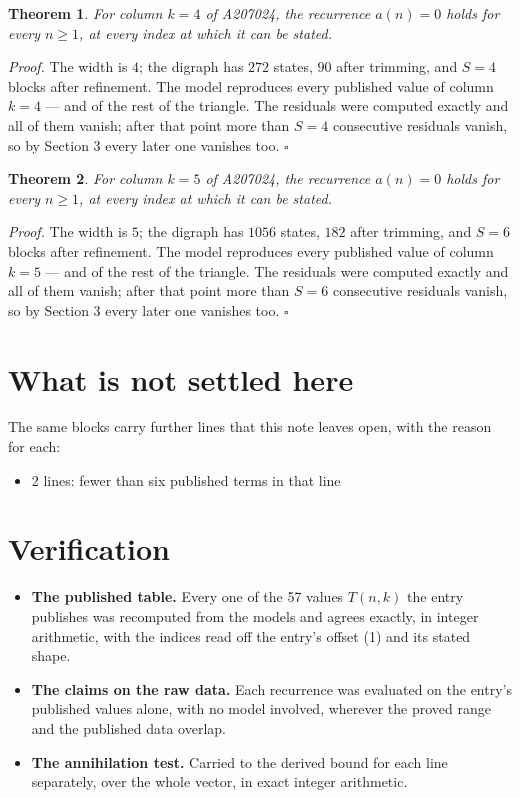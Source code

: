 \documentclass[11pt]{article}
\newtheorem{theorem}{Theorem}
\theoremstyle{definition}
\begin{document}
\begin{theorem} For column $k = 4$ of A207024, the recurrence $a(n) = 0$ holds for every $n \ge 1$, at every index at which it can be stated.\end{theorem}

{\itshape Proof.} The width is $4$; the digraph has $272$ states, $90$ after trimming, and $S = 4$ blocks after refinement. The model reproduces every published value of column $k = 4$ --- and of the rest of the triangle. The residuals were computed exactly and all of them vanish; after that point more than $S = 4$ consecutive residuals vanish, so by Section 3 every later one vanishes too. $\square$

\begin{theorem} For column $k = 5$ of A207024, the recurrence $a(n) = 0$ holds for every $n \ge 1$, at every index at which it can be stated.\end{theorem}

{\itshape Proof.} The width is $5$; the digraph has $1056$ states, $182$ after trimming, and $S = 6$ blocks after refinement. The model reproduces every published value of column $k = 5$ --- and of the rest of the triangle. The residuals were computed exactly and all of them vanish; after that point more than $S = 6$ consecutive residuals vanish, so by Section 3 every later one vanishes too. $\square$

\section{What is not settled here}

The same blocks carry further lines that this note leaves open, with the reason for each:

\begin{itemize}

\item 2 lines: fewer than six published terms in that line

\end{itemize}

\section{Verification}

\begin{itemize}

\item {\bfseries The published table.} Every one of the 57 values $T(n,k)$ the entry publishes was recomputed from the models and agrees exactly, in integer arithmetic, with the indices read off the entry's offset (1) and its stated shape.

\item {\bfseries The claims on the raw data.} Each recurrence was evaluated on the entry's published values alone, with no model involved, wherever the proved range and the published data overlap.

\item {\bfseries The annihilation test.} Carried to the derived bound for each line separately, over the whole vector, in exact integer arithmetic.

\end{itemize}
\end{document}
